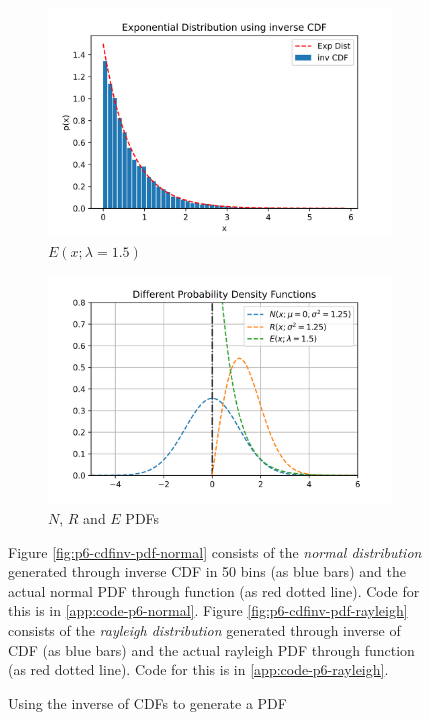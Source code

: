 \documentclass[main.tex]{article}
\begin{document}
\begin{figure}
\begin{subfigure}{.45\linewidth}
            \includegraphics[width=.95\linewidth]{plot_p6_exp.png}
            \caption{$E(x; \lambda = 1.5)$}
            \label{fig:p6-cdfinv-pdf-exp}
        \end{subfigure}
        \begin{subfigure}{.45\linewidth}
            \centering
            \includegraphics[width=.95\linewidth]{plot_p6_all.png}
            \caption{$N$, $R$ and $E$ PDFs}
            \label{fig:p6-subfig-all-pdfs}
        \end{subfigure}
        \caption[Visualizing PDFs as inverse of CDFs]{Using the inverse of CDFs to generate a PDF}
        \small
        Figure \ref{fig:p6-cdfinv-pdf-normal} consists of the \emph{normal distribution} generated through inverse CDF in 50 bins (as blue bars) and the actual normal PDF through function (as red dotted line). Code for this is in \ref{app:code-p6-normal}.
        Figure \ref{fig:p6-cdfinv-pdf-rayleigh} consists of the \emph{rayleigh distribution} generated through inverse of CDF (as blue bars) and the actual rayleigh PDF through function (as red dotted line). Code for this is in \ref{app:code-p6-rayleigh}.

\end{figure}
\end{document}
